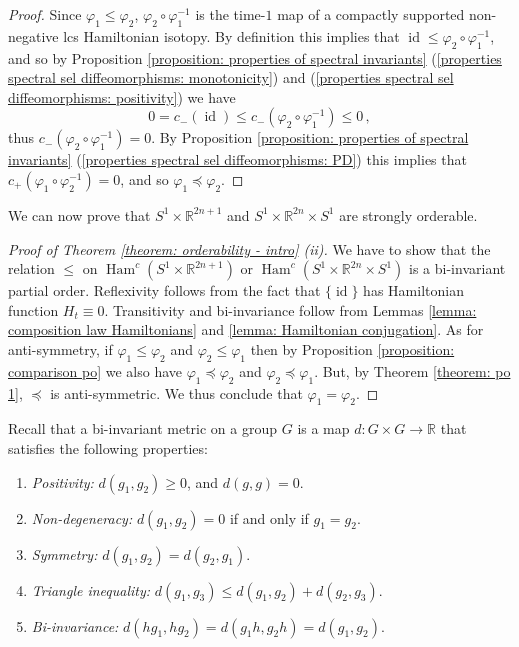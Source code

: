 \documentclass{amsart}
\DeclareMathOperator{\Ham}{Ham}
\DeclareMathOperator{\id}{id}
\theoremstyle{remark}
\begin{document}
\begin{proof}
Since $\varphi_1 \leq \varphi_2$,
$\varphi_2 \circ \varphi_1^{-1}$ is the time-$1$ map
of a compactly supported non-negative lcs Hamiltonian isotopy.
By definition this implies that $\id \leq \varphi_2 \circ \varphi_1^{-1}$,
and so by Proposition \ref{proposition: properties of spectral invariants}
(\ref{properties spectral sel diffeomorphisms: monotonicity})
and (\ref{properties spectral sel diffeomorphisms: positivity})
we have
\[
0 = c_- (\id) \leq c_- (\varphi_2 \circ \varphi_1^{-1}) \leq 0 \,,
\]
thus $c_- (\varphi_2 \circ \varphi_1^{-1}) = 0$.
By Proposition \ref{proposition: properties of spectral invariants}
(\ref{properties spectral sel diffeomorphisms: PD})
this implies that $c_+ (\varphi_1 \circ \varphi_2^{-1}) = 0$,
and so $\varphi_1 \preceq \varphi_2$.
\end{proof}

We can now prove 
that $S^1 \times \mathbb{R}^{2n+1}$ and $S^1 \times \mathbb{R}^{2n} \times S^1$
are strongly orderable.

\begin{proof}[Proof of Theorem \ref{theorem: orderability - intro} (ii)]
We have to show that the relation $\leq$ on $\Ham^c (S^1 \times \mathbb{R}^{2n+1})$
or $\Ham^c (S^1 \times \mathbb{R}^{2n} \times S^1)$
is a bi-invariant partial order.
Reflexivity follows from the fact that $\{\id\}$
has Hamiltonian function $H_t \equiv 0$.
Transitivity and bi-invariance follow
from Lemmas \ref{lemma: composition law Hamiltonians}
and \ref{lemma: Hamiltonian conjugation}.
As for anti-symmetry,
if $\varphi_1 \leq \varphi_2$ and $\varphi_2 \leq \varphi_1$
then by Proposition \ref{proposition: comparison po}
we also have $\varphi_1 \preceq \varphi_2$ and $\varphi_2 \preceq \varphi_1$.
But, by Theorem \ref{theorem: po 1},
$\preceq$ is anti-symmetric.
We thus conclude that $\varphi_1 = \varphi_2$.
\end{proof}

Recall that a bi-invariant metric on a group $G$
is a map $d: G \times G \rightarrow \mathbb{R}$
that satisfies the following properties:
\renewcommand{\theenumi}{\roman{enumi}}
\begin{enumerate}
\item \label{properties metric: positivity} \emph{Positivity:}
$d (g_1, g_2) \geq 0$,
and $d (g, g) = 0$.
\item \label{properties metric: non-degeneracy} \emph{Non-degeneracy:}
$d(g_1,g_2) = 0$ if and only if $g_1 = g_2$.
\item \label{properties metric: symmetry} \emph{Symmetry:}
$d (g_1, g_2) = d (g_2, g_1)$.
\item \label{properties metric: triangle inequality} \emph{Triangle inequality:}
$d (g_1, g_3) \leq  d (g_1, g_2) + d (g_2, g_3)$.
\item \label{properties metric: bi-invariance} \emph{Bi-invariance:}
$d (hg_1, hg_2) = d (g_1h, g_2h) = d (g_1, g_2)$.
\end{enumerate}
\end{document}
